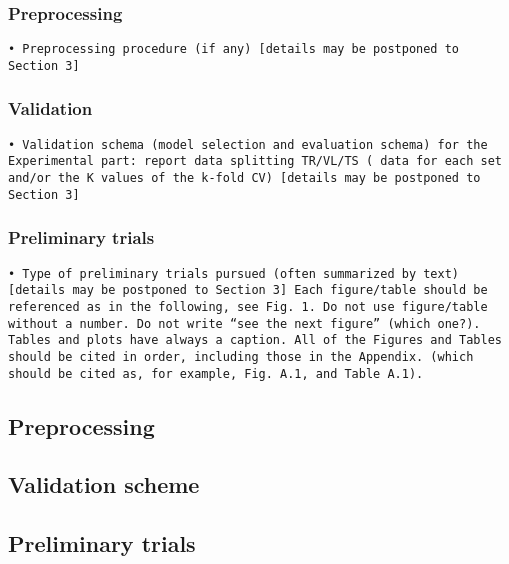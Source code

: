 \subsubsection{Preprocessing}
\texttt{• Preprocessing procedure (if any) [details may be postponed to Section 3]}

\subsubsection{Validation}
\texttt{• Validation schema (model selection and evaluation schema) for the Experimental part: report data splitting  TR/VL/TS ( data for each set and/or the K values of the k-fold CV) [details may be postponed to Section 3]}

\subsubsection{Preliminary trials}
\texttt{• Type of preliminary trials pursued (often summarized by text) [details may be postponed to Section 3]
Each figure/table should be referenced as in the following, see Fig. 1. 
Do not use figure/table without a number. Do not write “see the next figure” (which one?).
Tables and plots have always a caption. All of the Figures and Tables should be cited in order, including those in the Appendix. (which should be cited as, for example, Fig. A.1, and Table A.1).}

\subsection{Preprocessing}
\subsection{Validation scheme}
\subsection{Preliminary trials}